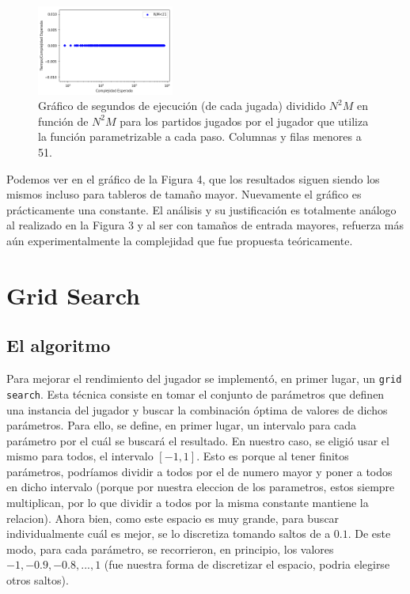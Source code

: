 \documentclass[A4paper,oneside,fleqn,11pt]{article}
\theoremstyle{definition}
\begin{document}
\begin{figure}
	\includegraphics[width=0.4\textwidth]{complejidad2b.png}
	\caption{ Gráfico de segundos de ejecución (de cada jugada) dividido $N^2 M$ en función de $N^2  M$ para los partidos jugados por el jugador que utiliza la función parametrizable a cada paso. Columnas y filas menores a 51.}
\end{figure}

Podemos ver en el gráfico de la Figura 4, que los resultados siguen siendo los mismos incluso para tableros de tamaño mayor. Nuevamente el gráfico es prácticamente una constante. El análisis y su justificación es totalmente análogo al realizado en la Figura 3 y al ser con tamaños de entrada mayores, refuerza más aún experimentalmente la complejidad que fue propuesta teóricamente.






\section{Grid Search}



\subsection{El algoritmo}

Para mejorar el rendimiento del jugador se implementó, en primer lugar, un \texttt{grid search}. Esta técnica consiste en tomar el conjunto de parámetros que definen una instancia del jugador y buscar la combinación óptima de valores de dichos parámetros. Para ello, se define, en primer lugar, un intervalo para cada parámetro por el cuál se buscará el resultado. En nuestro caso, se eligió usar el mismo para todos, el intervalo $[-1,1]$. Esto es porque al tener finitos parámetros, podríamos dividir a todos por el de numero mayor y poner a todos en dicho intervalo (porque por nuestra eleccion de los parametros, estos siempre multiplican, por lo que dividir a todos por la misma constante mantiene la relacion). Ahora bien, como este espacio es muy grande, para buscar individualmente cuál es mejor, se lo discretiza tomando saltos de a $0.1$. De este modo, para cada parámetro, se recorrieron, en principio, los valores $-1, -0.9,-0.8,...,1$ (fue nuestra forma de discretizar el espacio, podria elegirse otros saltos). 
\end{document}

